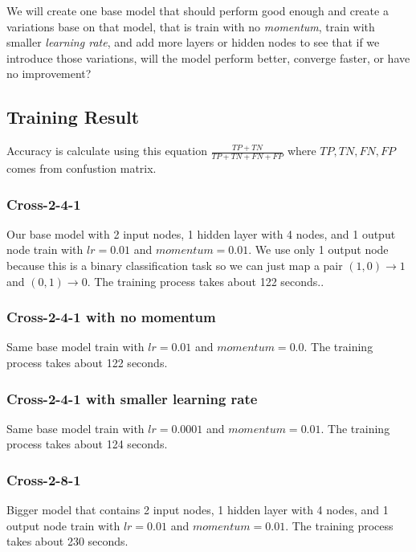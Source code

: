 \documentclass{article}
\begin{document}
We will create one base model that should perform good enough 
and create a variations base on that model, that is train 
with no \emph{momentum}, train with smaller \emph{learning rate}, 
and add more layers or hidden nodes to see that if we introduce 
those variations, will the model perform better, converge faster, or have no improvement?

\subsection*{Training Result}
Accuracy is calculate using this equation $\frac{TP+TN}{TP+TN+FN+FP}$ where $TP, TN, FN, FP$ comes from confustion matrix.
\subsubsection*{Cross-2-4-1}
Our base model with 2 input nodes, 1 hidden layer with 4 nodes, and 1 output node train with $lr = 0.01$ and $momentum = 0.01$. We use only 1 output node because this is a binary classification task so we can just map a pair $(1, 0) \rightarrow 1$ and $(0, 1) \rightarrow 0$.
The training process takes about 122 seconds..
\subsubsection*{Cross-2-4-1 with no momentum}
Same base model train with $lr = 0.01$ and $momentum = 0.0$.
The training process takes about 122 seconds.
\subsubsection*{Cross-2-4-1 with smaller learning rate}
Same base model train with $lr = 0.0001$ and $momentum = 0.01$.
The training process takes about 124 seconds.
\subsubsection*{Cross-2-8-1}
Bigger model that contains 2 input nodes, 1 hidden layer with 4 nodes, and 1 output node train with $lr = 0.01$ and $momentum = 0.01$.
The training process takes about 230 seconds.
\end{document}
